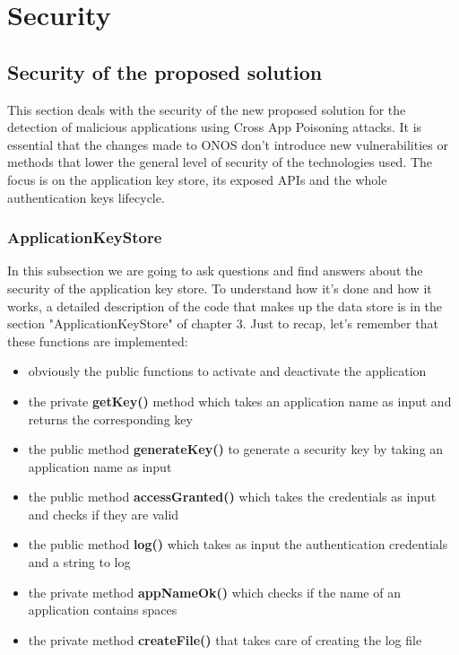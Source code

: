 \documentclass[a4paper,10pt]{memoir}
\begin{document}
\chapter{Security}

\section{Security of the proposed solution}

This section deals with the security of the new proposed solution for the detection of malicious applications using Cross App Poisoning attacks. It is essential that the changes made to ONOS don't introduce new vulnerabilities or methods that lower the general level of security of the technologies used. The focus is on the application key store, its exposed APIs and the whole authentication keys lifecycle.

\subsection{ApplicationKeyStore}

In this subsection we are going to ask questions and find answers about the security of the application key store. To understand how it's done and how it works, a detailed description of the code that makes up the data store is in the section "ApplicationKeyStore" of chapter 3. Just to recap, let's remember that these functions are implemented:
\begin{itemize}
\item obviously the public functions to activate and deactivate the application
\item the private \textbf{getKey()} method which takes an application name as input and returns the corresponding key
\item the public method \textbf{generateKey()} to generate a security key by taking an application name as input
\item the public method \textbf{accessGranted()} which takes the credentials as input and checks if they are valid
\item the public method \textbf{log()} which takes as input the authentication credentials and a string to log
\item the private method \textbf{appNameOk()} which checks if the name of an application contains spaces
\item the private method \textbf{createFile()} that takes care of creating the log file
\end{itemize}
\end{document}
